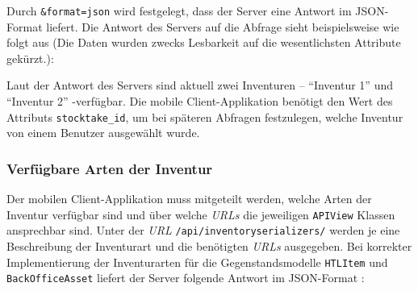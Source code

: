 \begin{Shaded}
\begin{Highlighting}[]
\NormalTok{/}\KeywordTok{\&}\KeywordTok{\&}
\end{Highlighting}
\end{Shaded}

Durch \texttt{\&format=json} wird festgelegt, dass der Server eine
Antwort im JSON-Format \cite{json-format-doku} liefert. Die Antwort des
Servers auf die Abfrage sieht beispielsweise wie folgt aus (Die Daten
wurden zwecks Lesbarkeit auf die wesentlichsten Attribute gekürzt.):

\begin{Shaded}
\begin{Highlighting}[]
\OtherTok{[}
    \FunctionTok{\{}
        \FunctionTok{:} \FunctionTok{,}
        \FunctionTok{:} \FunctionTok{,}
        \FunctionTok{:} \FunctionTok{,}
        \FunctionTok{:} \FunctionTok{,}
    \FunctionTok{\}}\OtherTok{,}
    \FunctionTok{\{}
        \FunctionTok{:} \FunctionTok{,}
        \FunctionTok{:} \FunctionTok{,}
        \FunctionTok{:} \FunctionTok{,}
        \FunctionTok{:} \FunctionTok{,}
    \FunctionTok{\}}
\OtherTok{]}
\end{Highlighting}
\end{Shaded}

Laut der Antwort des Servers sind aktuell zwei Inventuren -- ``Inventur
1'' und ``Inventur 2'' -verfügbar. Die mobile Client-Applikation
benötigt den Wert des Attributs \texttt{stocktake\_id}, um bei späteren
Abfragen festzulegen, welche Inventur von einem Benutzer ausgewählt
wurde.

\subsubsection*{Verfügbare Arten der Inventur}

Der mobilen Client-Applikation muss mitgeteilt werden, welche Arten der
Inventur verfügbar sind und über welche \emph{URLs}
 die jeweiligen
\texttt{APIView} Klassen ansprechbar sind. Unter der \emph{URL}
\texttt{/api/inventoryserializers/} werden je eine Beschreibung der
Inventurart und die benötigten \emph{URLs}
 ausgegeben. Bei
korrekter Implementierung der Inventurarten für die Gegenstandsmodelle
\texttt{HTLItem} und \texttt{BackOfficeAsset} liefert der Server
folgende Antwort im JSON-Format \cite{json-format-doku}:

